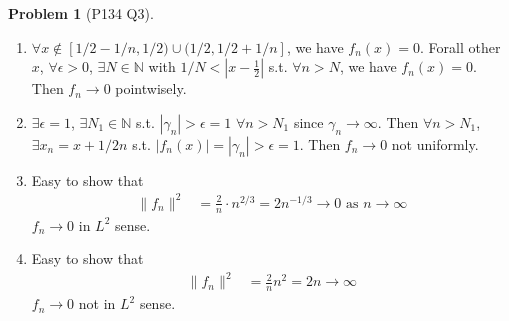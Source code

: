 \documentclass[twoside,11pt]{article}
\newcommand{\N}{\mathbb{N}}
\theoremstyle{definition}
\newtheorem{problem}{Problem}
\theoremstyle{remark}
\begin{document}
\begin{problem}[P134 Q3]\
\begin{enumerate}[label=(\alph*)]
\item $\forall x\notin [1/2-1/n, 1/2)\cup(1/2, 1/2+1/n]$, we have $f_n(x)=0$.
Forall other $x$, $\forall \epsilon>0$, $\exists N\in\N$ with $1/N<|x-\frac{1}{2}|$ 
s.t. $\forall n>N$, we have $f_n(x) = 0$.
Then $f_n\rightarrow 0$ pointwisely.

\item $\exists\epsilon=1$, $\exists N_1\in\N$ s.t. $|\gamma_n|>\epsilon=1$ $\forall n>N_1$
since $\gamma_n\rightarrow\infty$.
Then $\forall n > N_1$, $\exists x_n = x+1/2n$ s.t. $|f_n(x)|=|\gamma_n|>\epsilon=1$.
Then $f_n\rightarrow 0$ not uniformly.

\item Easy to show that
\begin{align*}
    \|f_n\|^2 &= \frac{2}{n}\cdot n^{2/3} = 2n^{-1/3}\rightarrow 0
    \text{ as } n\rightarrow \infty
\end{align*}
$f_n\rightarrow 0$ in $L^2$ sense.

\item Easy to show that
\begin{align*}
    \|f_n\|^2 &= \frac{2}{n}n^2 = 2n \rightarrow \infty
\end{align*}
$f_n\rightarrow 0$ not in $L^2$ sense.


\end{enumerate}
\end{problem}
\end{document}
